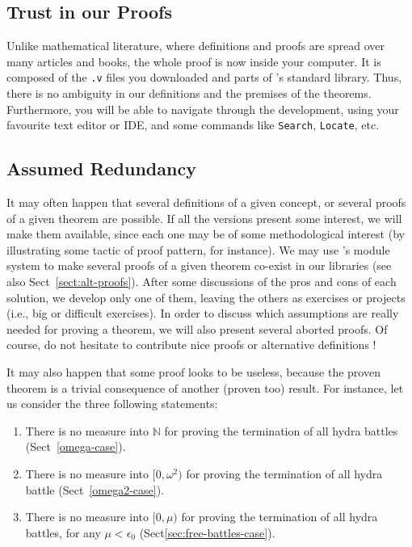 \documentclass[a4paper]{book}
\begin{document}



\subsection{Trust in our Proofs}
\label{sect:trust-in-proofs}

Unlike mathematical literature, where definitions and proofs are spread over many articles and books,
the whole proof is now inside your computer. It is composed of the \texttt{.v} files you downloaded and 
parts of \coq's standard library. Thus, there is no ambiguity in our definitions and the premises of the theorems. Furthermore, you will be able to navigate through the development, using your favourite text editor or IDE, and some commands like \texttt{Search}, \texttt{Locate},  etc.



\subsection{Assumed Redundancy}

It may often happen that several definitions of a given concept, or several proofs of a given theorem are possible. If all the versions present some interest, we will make them available, since each one may be of some methodological 
interest (by illustrating some tactic of proof pattern, for instance).
We may use \coq's module system to make several proofs of a given theorem co-exist in our libraries (see also Sect~\vref{sect:alt-proofs}).
After some discussions of the pros and cons of each solution, we develop only one of them, leaving the others  as exercises or projects (i.e., big or difficult exercises).
In order to discuss which assumptions are really needed for proving a theorem, we will also present 
several aborted proofs.
Of course, do not hesitate to contribute nice proofs or alternative definitions !

It may also happen that some proof looks to be useless, because the proven theorem is a trivial consequence of another (proven too) result.
For instance, let us consider the three following statements:
\begin{enumerate}
\item There is no measure into $\mathbb{N}$ for proving the termination of all hydra battles (Sect~\vref{omega-case}).
\item There is no measure into $[0,\omega^2)$ for proving the termination of all hydra battle (Sect~\vref{omega2-case}).
\item There is no measure into $[0,\mu)$ for proving the termination of all hydra battles, for any $\mu<\epsilon_0$ (Sect\vref{sec:free-battles-case}).
\end{enumerate}
\end{document}
